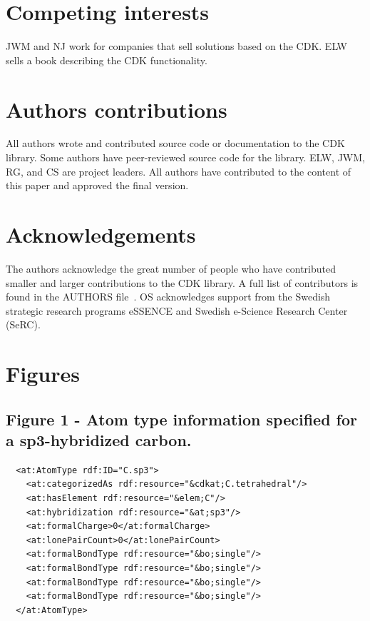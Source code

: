 \documentclass[10pt]{bmcart}
\begin{document}
\begin{backmatter}

\section*{Competing interests}
JWM and NJ work for companies that sell solutions based on the CDK. ELW sells
a book describing the CDK functionality.

\section*{Authors contributions}
All authors wrote and contributed source code or documentation to the CDK
library. Some authors have peer-reviewed source code for the library.
ELW, JWM, RG, and CS are project leaders. All authors have contributed to the
content of this paper and approved the final version.

\section*{Acknowledgements}
The authors acknowledge the great number of people who have contributed smaller
and larger contributions to the CDK library. A full list of contributors is
found in the AUTHORS file~\cite{AUTHORS}. OS acknowledges support from the Swedish strategic research programs eSSENCE and Swedish e-Science Research Center (SeRC).




\newpage

\section*{Figures}

\subsection*{Figure 1 - Atom type information specified for a sp3-hybridized
carbon.}\label{fig:atomtype}
\begin{verbatim}
  <at:AtomType rdf:ID="C.sp3">
    <at:categorizedAs rdf:resource="&cdkat;C.tetrahedral"/>
    <at:hasElement rdf:resource="&elem;C"/>
    <at:hybridization rdf:resource="&at;sp3"/>
    <at:formalCharge>0</at:formalCharge>
    <at:lonePairCount>0</at:lonePairCount>
    <at:formalBondType rdf:resource="&bo;single"/>
    <at:formalBondType rdf:resource="&bo;single"/>
    <at:formalBondType rdf:resource="&bo;single"/>
    <at:formalBondType rdf:resource="&bo;single"/>
  </at:AtomType>
\end{verbatim}


\end{backmatter}
\end{document}
